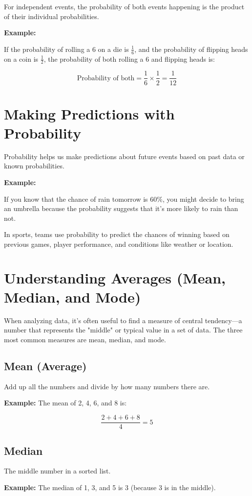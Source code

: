 For independent events, the probability of both events happening is the product of their individual probabilities.

\textbf{Example:}

If the probability of rolling a 6 on a die is $\frac{1}{6}$, and the probability of flipping heads on a coin is $\frac{1}{2}$, the probability of both rolling a 6 and flipping heads is:

\[
\text{Probability of both} = \frac{1}{6} \times \frac{1}{2} = \frac{1}{12}
\]

\section{Making Predictions with Probability}
Probability helps us make predictions about future events based on past data or known probabilities.

\textbf{Example:}

If you know that the chance of rain tomorrow is 60\%, you might decide to bring an umbrella because the probability suggests that it’s more likely to rain than not.

In sports, teams use probability to predict the chances of winning based on previous games, player performance, and conditions like weather or location.

\section{Understanding Averages (Mean, Median, and Mode)}
When analyzing data, it’s often useful to find a measure of central tendency—a number that represents the "middle" or typical value in a set of data. The three most common measures are mean, median, and mode.

\subsection{Mean (Average)}
Add up all the numbers and divide by how many numbers there are.

\textbf{Example:} The mean of 2, 4, 6, and 8 is:

\[
\frac{2 + 4 + 6 + 8}{4} = 5
\]

\subsection{Median}
The middle number in a sorted list.

\textbf{Example:} The median of 1, 3, and 5 is 3 (because 3 is in the middle).

